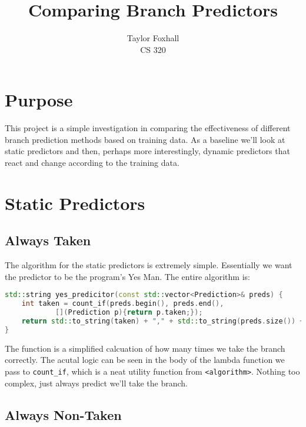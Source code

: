 \documentclass[12pt]{article}
\begin{document}
 
\title{Comparing Branch Predictors}
\author{Taylor Foxhall\\
CS 320}
 
\maketitle
\section{Purpose}
\label{sec:label}

This project is a simple investigation in comparing the effectiveness of
different branch prediction methods based on training data. As a baseline we'll
look at static predictors and then, perhaps more interestingly, dynamic
predictors that react and change according to the training data.
 
\section{Static Predictors}
\label{sec:label}

\subsection{Always Taken}
\label{subsec:label}

The algorithm for the static predictors is extremely simple. Essentially we want
the predictor to be the program's Yes Man. The entire algorithm is:

\begin{lstlisting}[language=C++, caption=Squirrel!, label=Always Taken]
std::string yes_predicitor(const std::vector<Prediction>& preds) {
    int taken = count_if(preds.begin(), preds.end(),
            [](Prediction p){return p.taken;});
    return std::to_string(taken) + "," + std::to_string(preds.size()) + ";";
}
\end{lstlisting}

The function is a simplified calcuation of how many times we take the
branch correctly. The acutal logic can be seen in the body of the lambda
function we pass to \lstinline|count_if|, which is a neat utility function from
\lstinline|<algorithm>|. Nothing too complex, just always predict we'll take the branch.

\subsection{Always Non-Taken}
\label{sec:label}
\end{document}
